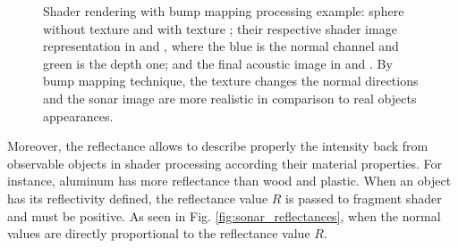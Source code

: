 \documentclass[final,5p,times]{elsarticle}
\begin{document}
\begin{figure}[t]
{        \label{fig:bump_4}
    }
    \captionsetup{justification=centering}
    \caption{Shader rendering with bump mapping processing example: sphere without texture  and with texture ; their respective shader image representation in  and , where the blue is the normal channel and green is the depth one; and the final acoustic image in  and . By bump mapping technique, the texture changes the normal directions and the sonar image are more realistic in comparison to real objects appearances.}
    \label{fig:sonar_bump_mapping}
\end{figure}

Moreover, the reflectance allows to describe properly the intensity back from observable objects in shader processing according their material properties. For instance, aluminum has more reflectance than wood and plastic. When an object has its reflectivity defined, the reflectance value $R$ is passed to fragment shader and must be positive. As seen in Fig. \ref{fig:sonar_reflectances}, when the normal values are directly proportional to the reflectance value $R$.
\end{document}

